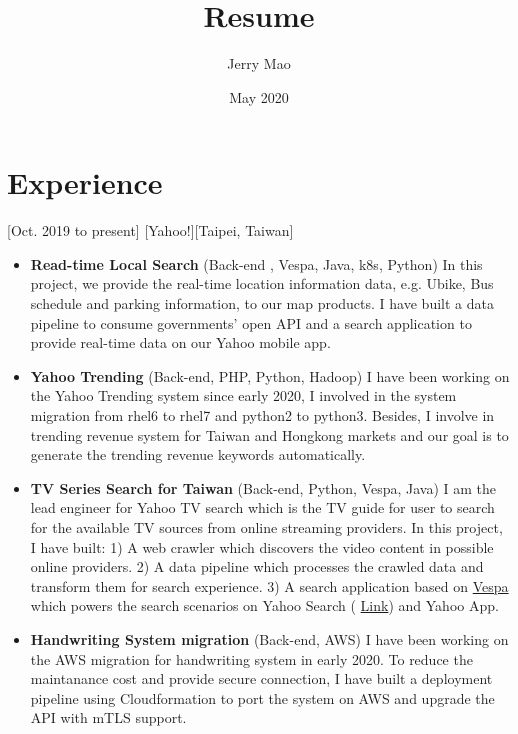 \documentclass{article}
\title{Resume}
\author{Jerry Mao}
\date{May 2020}
\begin{document}

\makecvtitle %

\section{Experience}
[Oct. 2019 to present]
[Yahoo!][Taipei, Taiwan]
\begin{itemize}
\item \textbf{Read-time Local Search} (Back-end , Vespa, Java, k8s, Python) In this project, we provide the real-time location information data, e.g. Ubike, Bus schedule and parking information, to our map products. I have built a data pipeline to consume governments' open API and a search application to provide real-time data on our Yahoo mobile app.
\item \textbf{Yahoo Trending} (Back-end, PHP, Python, Hadoop) I have been working on the Yahoo Trending system since early 2020, I involved in the system migration from rhel6 to rhel7 and python2 to python3. Besides, I involve in trending revenue system for Taiwan and Hongkong markets and our goal is to generate the trending revenue keywords automatically.
\item \textbf{TV Series Search for Taiwan} (Back-end, Python, Vespa, Java) I am the lead engineer for Yahoo TV search which is the TV guide for user to search for the available TV sources from online streaming providers. In this project, I have built: 1) A web crawler which discovers the video content in possible online providers. 2) A data pipeline which processes the crawled data and transform them for search experience. 3) A search application based on \href{https://vespa.ai/}{Vespa} which powers the search scenarios on Yahoo Search ( \href{https://tw.search.yahoo.com/search?p=%E9%80%B2%E6%93%8A%E7%9A%84%E5%B7%A8%E4%BA%BA}{
Link}) and Yahoo App. 
\item \textbf{Handwriting System migration} (Back-end, AWS) I have been working on the AWS migration for handwriting system in early 2020. To reduce the maintanance cost and provide secure connection, I have built a deployment pipeline using Cloudformation to port the system on AWS and upgrade the API with mTLS support.


\end{itemize}
\end{document}
